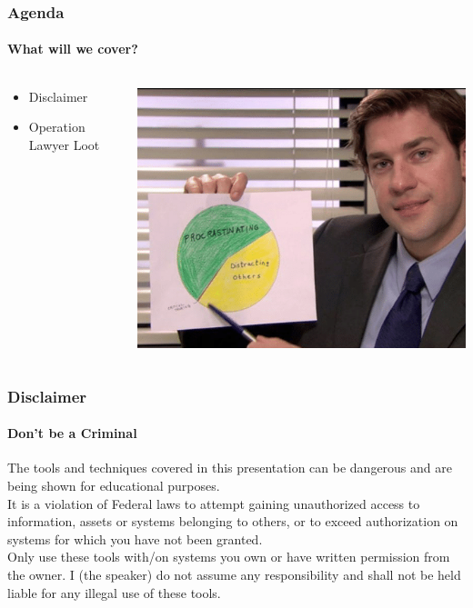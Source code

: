 \documentclass[aspectratio=169]{beamer}
\begin{document}
\begin{frame}
  \frametitle{Agenda}
  \framesubtitle{What will we cover?}
  \begin{columns}[onlytextwidth]
    \begin{column}{.50\textwidth}
      \begin{itemize}
      \item{Disclaimer}
      \item{Operation Lawyer Loot}
      \end{itemize}

    \end{column}
    \hfill
    \begin{column}{.50\textwidth}
      \begin{center}
        \includegraphics[scale=1.8]{agenda-meme}
      \end{center}
    \end{column}
  \end{columns}
\end{frame}

\begin{frame}
  \frametitle{Disclaimer}
  \framesubtitle{Don't be a Criminal}
  \begin{tcolorbox}[title=disclaimer\_0.log,colback=gray]
    The tools and techniques covered in this presentation can be dangerous and are\\
    being shown for educational purposes.\\
    \newline
    It is a violation of Federal laws to attempt gaining unauthorized access to information, assets or systems belonging to others, or to exceed authorization on systems for which you have not been granted.\\
    \newline
    Only use these tools with/on systems you own or have written permission from the owner. I (the speaker) do not assume any responsibility and shall not be held liable for any illegal use of these tools.\\
  \end{tcolorbox}
\end{frame}
\end{document}
